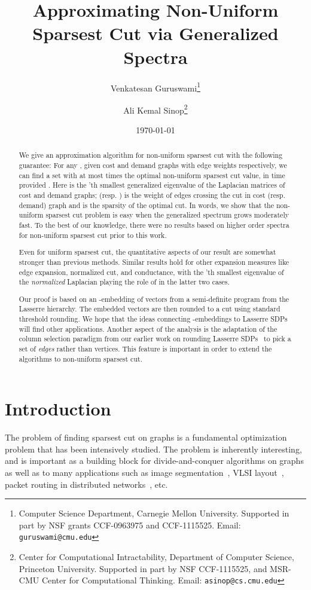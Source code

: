 \documentclass{article}
\title{
  {\bf 
Approximating Non-Uniform Sparsest Cut via Generalized Spectra}}
\author{ Venkatesan Guruswami\footnote{ Computer Science Department,
    Carnegie Mellon University.  Supported in part by NSF grants
    CCF-0963975 and CCF-1115525.  Email: {\tt guruswami@cmu.edu}} \and
  Ali Kemal Sinop\footnote{ Center for Computational Intractability,
    Department of Computer Science, Princeton University.  Supported
    in part by NSF CCF-1115525, and MSR-CMU Center for Computational
    Thinking.  Email: {\tt asinop@cs.cmu.edu}}} \date{\today}
\newcounter{alg-count}
\def\ngap{}
\begin{document}
\maketitle
\thispagestyle{empty}

\begin{abstract}
  We give an approximation algorithm for non-uniform sparsest cut with
  the following guarantee: For any , given cost
  and demand graphs with edge weights 
  respectively, we can find a set  with
   at most
   times the optimal non-uniform sparsest cut
  value, in time  provided . Here  is the 'th smallest
  generalized eigenvalue of the Laplacian matrices of cost and demand
  graphs;  (resp. ) is the
  weight of edges crossing the  cut in cost
  (resp. demand) graph and  is the sparsity of the optimal
  cut. In words, we show that the non-uniform sparsest cut problem is
  easy when the generalized spectrum grows moderately fast. To the
  best of our knowledge, there were no results based on higher order
  spectra for non-uniform sparsest cut prior to this work.

  Even for uniform sparsest cut, the quantitative aspects of our
  result are somewhat stronger than previous methods.  Similar results
  hold for other expansion measures like edge expansion, normalized
  cut, and conductance, with the 'th smallest eigenvalue of the
  {\em normalized} Laplacian playing the role of  in the
  latter two cases.

  Our proof is based on an -embedding of vectors from a
  semi-definite program from the Lasserre hierarchy.  The embedded
  vectors are then rounded to a cut using standard threshold
  rounding. We hope that the ideas connecting -embeddings to
  Lasserre SDPs will find other applications. Another aspect of the
  analysis is the adaptation of the column selection paradigm from our
  earlier work on rounding Lasserre SDPs~\cite{gs11-qip} to pick a set
  of {\em edges} rather than vertices. This feature is important in
  order to extend the algorithms to non-uniform sparsest cut.
\end{abstract}

\section{Introduction}
\ngap The problem of finding sparsest cut on graphs is a fundamental
optimization problem that has been intensively studied. The problem is
inherently interesting, and is important as a building block for
divide-and-conquer algorithms on graphs as well as to many
applications such as image segmentation~\cite{sm00,sg07a}, VLSI
layout~\cite{bl84}, packet routing in distributed
networks~\cite{ap90a}, etc.
\end{document}
